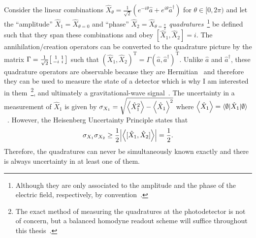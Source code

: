 Consider the linear combinations $\hat{X}_\theta=\frac{1}{\sqrt 2}(e^{-i \theta}\hat{a}+e^{i \theta}\hat{a}^\dag)$ for $\theta\in[0,2\pi)$ and let the ``amplitude'' $\hat{X}_1=\hat{X}_{\theta=0}$ and ``phase'' $\hat{X}_2=\hat{X}_{\theta=\frac{\pi}{2}}$ \emph{quadratures}~\footnote{Although they are only associated to the amplitude and the phase of the electric field, respectively, by convention~\cite{danilishinQuantumMeasurementTheory2012}.} be defined such that they span these combinations and obey $[\hat{X}_1,\hat{X}_2]=i$. The annihilation/creation operators can be converted to the quadrature picture by the matrix $\Gamma = \frac{1}{\sqrt2} \begin{bsmallmatrix}1 & 1 \\-i & i\end{bsmallmatrix}$ such that $(\hat{X}_1,\hat{X}_2)^\text{T}=\Gamma(\hat{a},\hat{a}^\dag)^\text{T}$. %
Unlike $\hat a$ and $\hat a^\dag$, these quadrature operators are observable because they are Hermitian~\cite{} and therefore they can be used to measure the state of a detector which is why I am interested in them~\footnote{The exact method of measuring the quadratures at the photodetector is not of concern, but a balanced homodyne readout scheme will suffice throughout this thesis~\cite{}.}, and ultimately a gravitational-wave signal~\cite{}. The uncertainty in a measurement of $\hat{X}_1$ is given by $\sigma_{X_1}=\sqrt{\ev{\hat{X}_1^2}-\ev{\hat{X}_1}^2}$ where $\ev{\hat{X}_1}=\langle\emptyset\lvert\hat{X}_1\rvert\emptyset\rangle$~\cite{}. However, the Heisenberg Uncertainty Principle states that~\cite{}
\begin{equation}\label{eq:HUP_time_domain}
\sigma_{X_1}\sigma_{X_2}\geq\frac{1}{2}\abs{\ev{[\hat{X}_1,\hat{X}_2]}}=\frac{1}{2}.
\end{equation}
Therefore, the quadratures can never be simultaneously known exactly and there is always uncertainty in at least one of them. %
